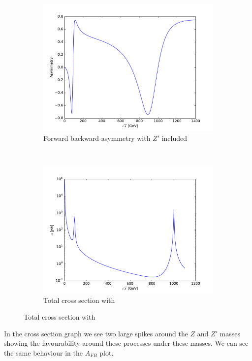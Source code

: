 \documentclass{article}
\begin{document}
\begin{figure}[h!]
  \caption{$e^+e^-\rightarrow \gamma,Z,Z' \rightarrow \mu^+\mu^-$}
  \centering
  \begin{subfigure}[b]{0.45\textwidth}
    \includegraphics[width=\textwidth]{../tables/ZpAsym.pdf}
    \caption{Forward backward asymmetry with $Z'$ included}
  \end{subfigure}
  ~
  \begin{subfigure}[b]{0.45\textwidth}
    \includegraphics[width=\textwidth]{../tables/ZpCross.pdf}
    \caption{Total cross section with}
  \end{subfigure}
\end{figure}
%
In the cross section graph we see two large spikes around the $Z$ and $Z'$ masses
showing the favourability around these processes under these masses. We can see the
same behaviour in the $A_{FB}$ plot.
\end{document}
